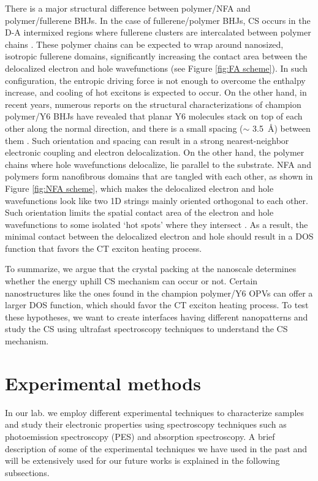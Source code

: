 \documentclass[12pt]{article}
\begin{document}
There is a major structural difference between polymer/NFA and polymer/fullerene BHJs. In the case of fullerene/polymer BHJs, CS occurs in the D-A intermixed regions where fullerene clusters are intercalated between polymer chains \cite{causa2016fate}. These polymer chains can be expected to wrap around nanosized, isotropic fullerene domains, significantly increasing the contact area between the delocalized electron and hole wavefunctions (see Figure \ref{fig:FA scheme}). In such configuration, the entropic driving force is not enough to overcome the enthalpy increase, and cooling of hot excitons is expected to occur. On the other hand, in recent years, numerous reports on the structural characterizations of champion polymer/Y6 BHJs have revealed that planar Y6 molecules stack on top of each other along the normal direction, and there is a small spacing ($\sim$ \SI{3.5}{\angstrom}) between them \cite{liu202018,zhang2020delocalization,zhu2020crystallography}. Such orientation and spacing can result in a strong nearest-neighbor electronic coupling and electron delocalization. On the other hand, the polymer chains where hole wavefunctions delocalize, lie parallel to the substrate. NFA and polymers form nanofibrous domains that are tangled with each other, as shown in Figure \ref{fig:NFA scheme}, which makes the delocalized electron and hole wavefunctions look like two 1D strings mainly oriented orthogonal to each other. Such orientation limits the spatial contact area of the electron and hole wavefunctions to some isolated \lq{hot spots}' where they intersect \cite{zhang2020delocalization}. As a result, the minimal contact between the delocalized electron and hole should result in a DOS function that favors the CT exciton heating process.
\vspace{7pt}

To summarize, we argue that the crystal packing at the nanoscale determines whether the energy uphill CS mechanism can occur or not. Certain nanostructures like the ones found in the champion polymer/Y6 OPVs can offer a larger DOS function, which should favor the CT exciton heating process. To test these hypotheses, we want to create interfaces having different nanopatterns and study the CS using ultrafast spectroscopy techniques to understand the CS mechanism.

\section{Experimental methods}
In our lab. we employ different experimental techniques to characterize samples and study their electronic properties using spectroscopy techniques such as photoemission spectroscopy (PES) and absorption spectroscopy. A brief description of some of the experimental techniques we have used in the past and will be extensively used for our future works is explained in the following subsections. 
\end{document}
